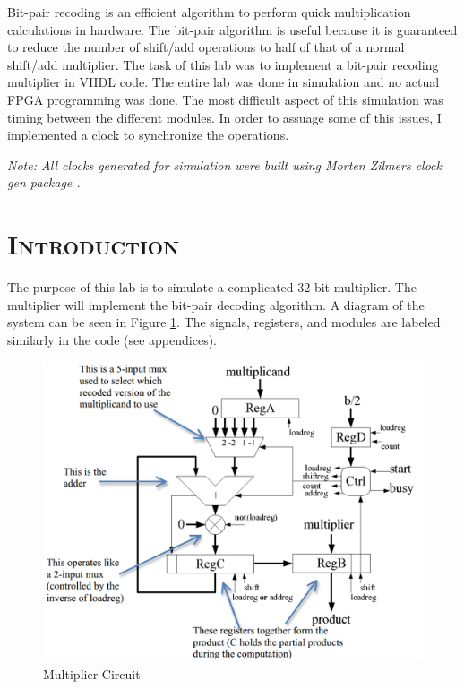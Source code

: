 \documentclass[11pt]{report}
\begin{document}
\begin{spacing}{1.5}
Bit-pair recoding is an efficient algorithm to perform quick multiplication calculations in hardware.  The bit-pair algorithm is useful because it is guaranteed to reduce the number of shift/add operations to half of that of a normal shift/add multiplier.  The task of this lab was to implement a bit-pair recoding multiplier in VHDL code.  The entire lab was done in simulation and no actual FPGA programming was done.  The most difficult aspect of this simulation was timing between the different modules.  In order to assuage some of this issues, I implemented a clock to synchronize the operations.
\vspace{4.5in}

\textit{Note: All clocks generated for simulation were built using Morten Zilmers clock gen package \cite{Synth}.}

\thispagestyle{empty} %
\clearpage
\setcounter{page}{1}

\section*{\scshape Introduction} %
\label{cha:introduction}

The purpose of this lab is to simulate a complicated 32-bit multiplier.  The multiplier will implement the bit-pair decoding algorithm.  A diagram of the system can be seen in Figure \ref{fig:system}.  The signals, registers, and modules are labeled similarly in the code (see appendices).

\vspace{15px}
\begin{figure}[H]
    \centering
    \includegraphics[width=1.0\textwidth,keepaspectratio]{system.png}
    \caption{Multiplier Circuit}
    \label{fig:system}
\end{figure}


\end{spacing}
\end{document}
